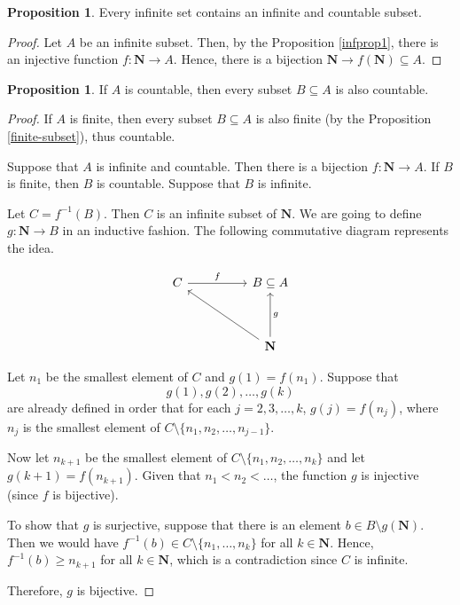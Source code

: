 \documentclass[12pt,a4paper]{article}
\theoremstyle{definition}
\newtheorem{proposition}[theorem]{Proposition}
\begin{document}
\begin{proposition}\label{propcount1}
	Every infinite set contains an infinite and countable subset.
\end{proposition}

\begin{proof}
	Let $A$ be an infinite subset. Then, by the Proposition \ref{infprop1}, there is an injective function $f : \textbf{N} \longrightarrow A$. Hence, there is a bijection $\textbf{N} \longrightarrow f(\textbf{N}) \subseteq A$.
\end{proof}

\begin{proposition}\label{propcount2}
	If $A$ is countable, then every subset $B \subseteq A$ is also countable.
\end{proposition}

\begin{proof}
	If $A$ is finite, then every subset $B \subseteq A$ is also finite (by the Proposition \ref{finite-subset}), thus countable.
	
	Suppose that $A$ is infinite and countable. Then there is a bijection $f : \textbf{N} \longrightarrow A$. If $B$ is finite, then $B$ is countable. Suppose that $B$ is infinite.
	
	Let $C = f^{-1}(B)$. Then $C$ is an infinite subset of $\textbf{N}$. We are going to define $g : \textbf{N} \longrightarrow B$ in an inductive fashion. The following commutative diagram represents the idea.
	
\[\begin{tikzcd}
	C && {B \subseteq A} \\
	\\
	&& {\textbf{N}}
	\arrow["g"', from=3-3, to=1-3]
	\arrow["f", from=1-1, to=1-3]
	\arrow[from=3-3, to=1-1]
\end{tikzcd}\]

	Let $n_1$ be the smallest element of $C$ and $g(1) = f(n_1)$. Suppose that \[ g(1), g(2), \ldots, g(k) \] are already defined in order that for each $j = 2, 3, \ldots, k$, $g(j) = f(n_j)$, where $n_j$ is the smallest element of $C \setminus \{n_1, n_2, \ldots, n_{j-1} \}$.
	
	Now let $n_{k+1}$ be the smallest element of $C \setminus \{n_1, n_2, \ldots, n_k \}$ and let $g(k+1) = f(n_{k+1})$. Given that $n_1 < n_2 < \ldots$, the function $g$ is injective (since $f$ is bijective).
	
	To show that $g$ is surjective, suppose that there is an element $b \in B \setminus g(\textbf{N})$. Then we would have $f^{-1}(b) \in C \setminus \{ n_1, \ldots, n_k \}$ for all $k \in \textbf{N}$. Hence, $f^{-1}(b) \geq n_{k+1}$ for all $k \in \textbf{N}$, which is a contradiction since $C$ is infinite.
	
	Therefore, $g$ is bijective.
	
\end{proof}
\end{document}
